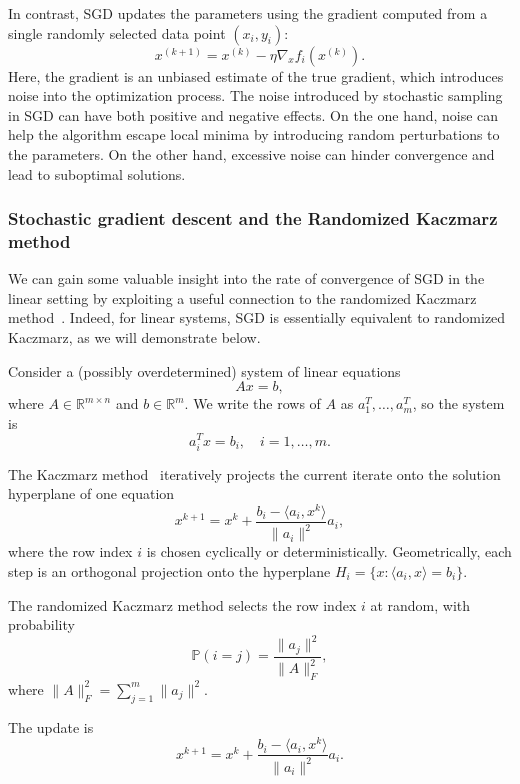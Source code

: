 In contrast, SGD updates the parameters using the gradient computed from a single randomly selected data point $ (x_i, y_i) $:
$$
x^{(k+1)} = x^{(k)} - \eta \nabla_x f_i(x^{(k)}).
$$
Here, the gradient is an unbiased estimate of the true gradient, which introduces noise into the optimization process. 
The noise introduced by stochastic sampling in SGD can have both positive and negative effects. On the one hand, noise can help the algorithm escape local minima by introducing random perturbations to the parameters. On the other hand, excessive noise can hinder convergence and lead to suboptimal solutions.



\subsubsection{Stochastic gradient descent and the Randomized Kaczmarz method}\label{ss:kaczmarz}

We can gain some valuable insight into the rate of convergence of SGD in the linear setting by exploiting a useful connection to the randomized Kaczmarz method~\cite{SV06}. Indeed, for linear systems, SGD is essentially equivalent to  randomized Kaczmarz, as we will demonstrate below. 

Consider a (possibly overdetermined) system of linear equations 
\begin{equation}\label{kaczmarzsystem}
    Ax=b,
\end{equation}
where $A \in \mathbb{R}^{m \times n}$ and $b \in \mathbb{R}^m$. We write the rows of $A$ as $a_1^T,\dots,a_m^T$, so the system is
$$
a_i^T x = b_i, \quad i=1,\dots,m.
$$

The Kaczmarz method~\cite{karczmarz1937} iteratively projects the current iterate onto the solution hyperplane of one equation
$$
x^{k+1}
= x^k + \frac{b_i - \langle a_i, x^k \rangle}{\|a_i\|^2} a_i,
$$
where the row index $i$ is chosen cyclically or deterministically.
Geometrically, each step is an orthogonal projection onto the hyperplane
$H_i = \{x : \langle a_i, x\rangle = b_i\}$.

The randomized Kaczmarz method selects the row index $i$ at random, with probability
\begin{equation}
\label{eq:importancesampling}   
\mathbb{P}(i = j) = \frac{\|a_j\|^2}{\|A\|_F^2},
\end{equation}
where $\|A\|_F^2 = \sum_{j=1}^m \|a_j\|^2$.

The update is
$$
x^{k+1} = x^k + \frac{b_i - \langle a_i, x^k\rangle}{\|a_i\|^2} a_i.
$$



